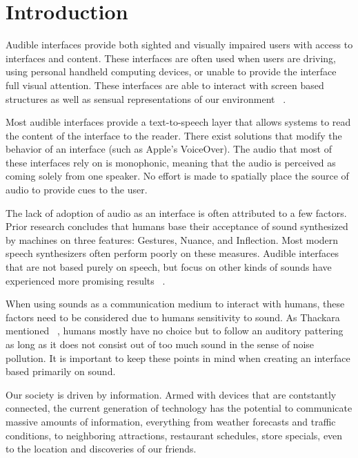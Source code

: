 \newpage                                                 \chapter{Introduction}
\renewcommand{\thepage }{\arabic{page}}                    \setcounter{page}{1}

Audible interfaces provide both sighted and visually impaired users with access
to interfaces and content. These interfaces are often used when users are
driving, using personal handheld computing devices, or unable to provide the
interface full visual attention. These interfaces are able to interact with
screen based structures as well as sensual representations of our environment
~\cite{michelis2008disappearing}.

Most audible interfaces provide a text-to-speech layer that allows systems to
read the content of the interface to the reader.  There exist solutions that
modify the behavior of an interface (such as Apple’s VoiceOver).  The audio that
most of these interfaces rely on is monophonic, meaning that the audio is
perceived as coming solely from one speaker.  No effort is made to spatially
place the source of audio to provide cues to the user.

The lack of adoption of audio as an interface is often attributed to a few
factors. Prior research concludes that humans base their acceptance of sound
synthesized by machines on three features: Gestures, Nuance, and Inflection.
Most modern speech synthesizers often perform poorly on these measures.
Audible interfaces that are not based purely on speech, but focus on other
kinds of sounds have experienced more promising results
~\cite{thackara2005bubble}.

When using sounds as a communication medium to interact with humans, these
factors need to be considered due to humans sensitivity to sound. As Thackara
mentioned ~\cite{thackara2005bubble}, humans mostly have no choice but to
follow an auditory pattering as long as it does not consist out of too much
sound in the sense of noise pollution. It is important to keep these points
in mind when creating an interface based primarily on sound.

Our society is driven by information. Armed with devices that are contstantly
connected, the current generation of technology has the potential to communicate
massive amounts of information, everything from weather forecasts and traffic
conditions, to neighboring attractions, restaurant schedules, store specials,
even to the location and discoveries of our friends.

